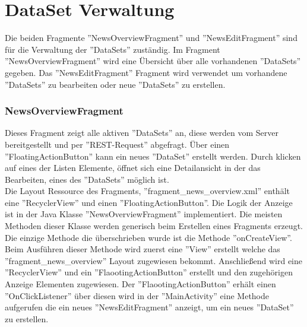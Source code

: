 \section{DataSet Verwaltung}
Die beiden Fragmente  ''NewsOverviewFragment'' und ''NewsEditFragment'' sind für die Verwaltung der ''DataSets'' zuständig. Im Fragment ''NewsOverviewFragment'' wird eine Übersicht über alle vorhandenen ''DataSets'' gegeben. Das ''NewsEditFragment'' Fragment wird verwendet um vorhandene ''DataSets'' zu bearbeiten oder neue ''DataSets'' zu erstellen. 
\subsubsection{NewsOverviewFragment}
Dieses Fragment zeigt alle aktiven ''DataSets'' an, diese werden vom Server bereitgestellt und per ''REST-Request'' abgefragt. Über einen ''FloatingActionButton'' kann ein neues ''DataSet'' erstellt werden. Durch klicken auf eines der Listen Elemente, öffnet sich eine Detailansicht in der das Bearbeiten, eines des ''DataSets'' möglich ist.
\\
Die Layout Ressource des Fragments, ''fragment\_news\_overview.xml'' enthält eine ''RecyclerView'' und einen ''FloatingActionButton''. Die Logik der Anzeige ist in der Java Klasse ''NewsOverviewFragment'' implementiert. Die meisten Methoden dieser Klasse werden generisch beim Erstellen eines Fragments erzeugt. Die einzige Methode die überschrieben wurde ist die Methode ''onCreateView''. Beim Ausführen dieser Methode wird zuerst eine ''View'' erstellt welche das ''fragment\_news\_overview'' Layout zugewiesen bekommt. Anschließend wird eine ''RecyclerView'' und ein ''FlaootingActionButton'' erstellt und den zugehörigen Anzeige Elementen zugewiesen. Der ''FlaootingActionButton'' erhält einen ''OnClickListener'' über diesen wird in der ''MainActivity'' eine Methode aufgerufen die ein neues ''NewsEditFragment'' anzeigt, um ein neues ''DataSet'' zu erstellen. 

